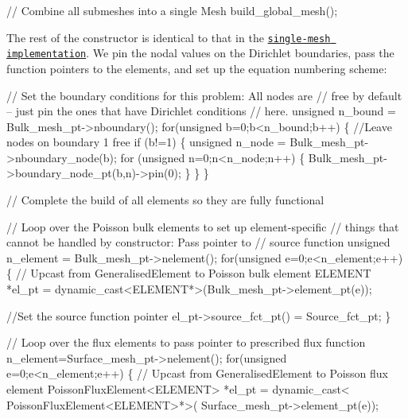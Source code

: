 \begin{DoxyCodeInclude}
 \textcolor{comment}{// Combine all submeshes into a single Mesh}
 build\_global\_mesh();

\end{DoxyCodeInclude}


The rest of the constructor is identical to that in the \href{../../two_d_poisson_flux_bc/html/index.html}{\tt single-\/mesh implementation}. We pin the nodal values on the Dirichlet boundaries, pass the function pointers to the elements, and set up the equation numbering scheme\+:


\begin{DoxyCodeInclude}
 \textcolor{comment}{// Set the boundary conditions for this problem: All nodes are}
 \textcolor{comment}{// free by default -- just pin the ones that have Dirichlet conditions}
 \textcolor{comment}{// here. }
 \textcolor{keywordtype}{unsigned} n\_bound = Bulk\_mesh\_pt->nboundary();
 \textcolor{keywordflow}{for}(\textcolor{keywordtype}{unsigned} b=0;b<n\_bound;b++)
  \{
   \textcolor{comment}{//Leave nodes on boundary 1 free}
   \textcolor{keywordflow}{if} (b!=1)
    \{
     \textcolor{keywordtype}{unsigned} n\_node = Bulk\_mesh\_pt->nboundary\_node(b);
     \textcolor{keywordflow}{for} (\textcolor{keywordtype}{unsigned} n=0;n<n\_node;n++)
      \{
       Bulk\_mesh\_pt->boundary\_node\_pt(b,n)->pin(0); 
      \}
    \}
  \}

 \textcolor{comment}{// Complete the build of all elements so they are fully functional}

 \textcolor{comment}{// Loop over the Poisson bulk elements to set up element-specific }
 \textcolor{comment}{// things that cannot be handled by constructor: Pass pointer to }
 \textcolor{comment}{// source function}
 \textcolor{keywordtype}{unsigned} n\_element = Bulk\_mesh\_pt->nelement();
 \textcolor{keywordflow}{for}(\textcolor{keywordtype}{unsigned} e=0;e<n\_element;e++)
  \{
   \textcolor{comment}{// Upcast from GeneralisedElement to Poisson bulk element}
   ELEMENT *el\_pt = \textcolor{keyword}{dynamic\_cast<}ELEMENT*\textcolor{keyword}{>}(Bulk\_mesh\_pt->element\_pt(e));

   \textcolor{comment}{//Set the source function pointer}
   el\_pt->source\_fct\_pt() = Source\_fct\_pt;
  \}

 \textcolor{comment}{// Loop over the flux elements to pass pointer to prescribed flux function}
 n\_element=Surface\_mesh\_pt->nelement();
 \textcolor{keywordflow}{for}(\textcolor{keywordtype}{unsigned} e=0;e<n\_element;e++)
  \{
   \textcolor{comment}{// Upcast from GeneralisedElement to Poisson flux element}
   PoissonFluxElement<ELEMENT> *el\_pt = 
    \textcolor{keyword}{dynamic\_cast<} PoissonFluxElement<ELEMENT>*\textcolor{keyword}{>}(
     Surface\_mesh\_pt->element\_pt(e));


\end{DoxyCodeInclude}
